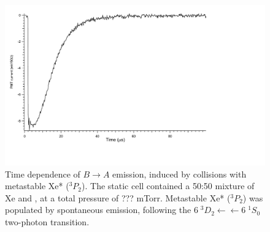 \documentclass[12pt]{mitthesis}
\begin{document}
\begin{figure}
  \caption{Time dependence of  $B \rightarrow A$ emission,
    induced by collisions with metastable Xe* ($^3P_2$).  The static
    cell contained a 50:50 mixture of Xe and , at a total
    pressure of ???  mTorr.  Metastable Xe* ($^3P_2$) was populated by
    spontaneous emission, following the $6\;^3D_2 \leftarrow
    \leftarrow 6\;^1S_0$ two-photon transition.}
  \label{fig:xen2-firstlight}
  \centering
  \includegraphics[width=7in,trim=2cm 0 1in 0]{XeN2-firstlight.pdf}
\end{figure}
\end{document}

